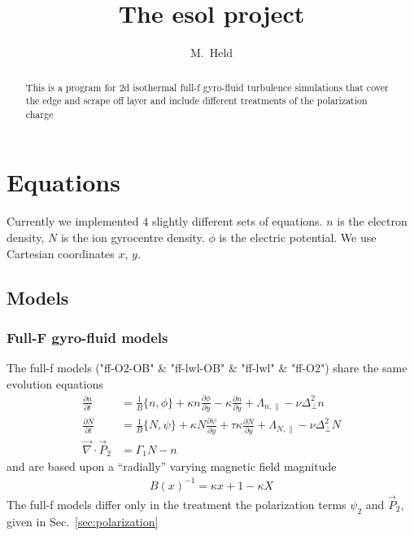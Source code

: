 

\usepackage{minted}



\title{The esol project}
\author{M.~Held}
\maketitle

\begin{abstract}
  This is a program for 2d isothermal full-f gyro-fluid turbulence simulations 
that cover the edge and scrape off layer and include different treatments of the 
polarization charge
\end{abstract}

\section{Equations}
Currently we implemented $4$ slightly different sets of equations. $n$ is the 
electron density, $N$ is the ion gyrocentre density. $\phi$ is the electric 
potential. We
use Cartesian coordinates $x$, $y$.
\subsection{Models}
\subsubsection{Full-F gyro-fluid models}
The full-f models ("ff-O2-OB" \& "ff-lwl-OB" \& "ff-lwl" \& "ff-O2") share the 
same evolution equations
\begin{subequations}
\begin{align}
 \frac{\partial n}{\partial t}     &= 
    \frac{1}{B}\{ n, \phi\} 
  + \kappa n\frac{\partial \phi}{\partial y} 
  -\kappa \frac{\partial n}{\partial y} + \Lambda_{n,\parallel}
  - \nu \Delta_\perp^2 n  \\
  \frac{\partial N}{\partial t} &=
  \frac{1}{B}\{ N, \psi\} 
  + \kappa N\frac{\partial \psi}{\partial y} 
  + \tau \kappa\frac{\partial N}{\partial y} + \Lambda_{N,\parallel}-\nu 
\Delta_\perp^2 N \\
   \vec{\nabla}\cdot \vec{P}_2 &= \Gamma_1 N-n
\end{align}
\end{subequations}
and are based upon a ``radially'' varying magnetic field magnitude
\begin{align}
 B(x)^{-1} = \kappa x +1-\kappa X 
\end{align}
The full-f models differ only in the treatment the  polarization terms 
\(\psi_2\) and \(\vec{P}_2\), given in Sec.~\ref{sec:polarization}
